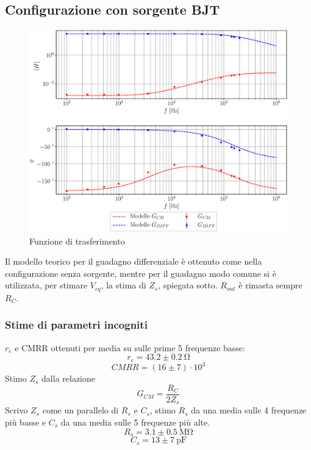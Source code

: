 \documentclass[.../presentazione_orale.tex]{subfiles}
\begin{document}
\subsection*{Configurazione con sorgente BJT}
\begin{figure}[h!]
    \centering
    \includegraphics[scale = 0.6]{Grafici/sorgente.eps}
    \caption{Funzione di trasferimento}
    \label{fig:resistenza}
\end{figure}
Il modello teorico per il guadagno differenziale è ottenuto come nella configurazione senza sorgente, mentre per il guadagno modo comune si è utilizzata, per stimare $V_{eq}$, la stima di $Z_s$, spiegata sotto. $R_{out}$ è rimasta sempre $R_C$.

\subsubsection*{Stime di parametri incogniti}
$r_e$ e CMRR ottenuti per media su sulle prime 5 frequenze basse:
$$ r_e = 43.2\pm 0.2~\si{\ohm}$$
$$ CMRR = (16\pm7)\cdot 10^{3}$$
Stimo $Z_s$ dalla relazione $$G_{CM} = \frac{R_C}{2 Z_s}$$
Scrivo $Z_s$ come un parallelo di $R_s$ e $C_s$, stimo $R_s$ da una media sulle 4 frequenze più basse e $C_s$ da una media sulle 5 frequenze più alte.
$$ R_s = 3.1\pm0.5~\si{\mega\ohm}$$
$$C_s = 13\pm7~\si{\pico\farad}$$
\end{document}
